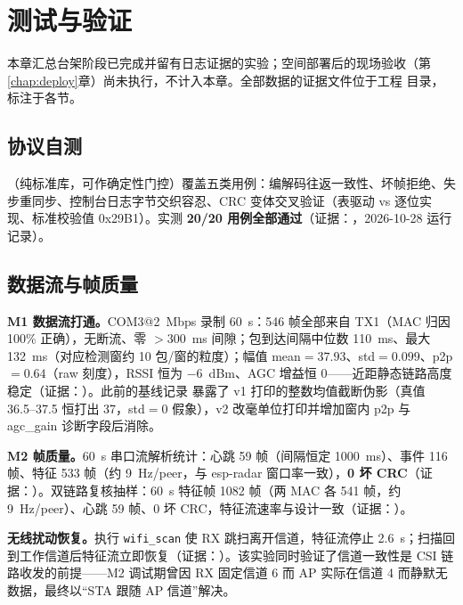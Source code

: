 \chapter{测试与验证}\label{chap:verify}

本章汇总台架阶段已完成并留有日志证据的实验；空间部署后的现场验收（第\ref{chap:deploy}章）尚未执行，不计入本章。全部数据的证据文件位于工程  目录，标注于各节。

\section{协议自测}\label{sec:selftest}

（纯标准库，可作确定性门控）覆盖五类用例：编解码往返一致性、坏帧拒绝、失步重同步、控制台日志字节交织容忍、CRC 变体交叉验证（表驱动 vs 逐位实现、标准校验值 0x29B1）。实测 \textbf{20/20 用例全部通过}（证据：，2026-10-28 运行记录）。

\section{数据流与帧质量}\label{sec:link}

\textbf{M1 数据流打通。}COM3@2~Mbps 录制 60~s：546 帧全部来自 TX1（MAC 归因 100\% 正确），无断流、零 $>$300~ms 间隙；包到达间隔中位数 110~ms、最大 132~ms（对应检测窗约 10 包/窗的粒度）；幅值 mean${}=37.93$、std${}=0.099$、p2p${}=0.64$（raw 刻度），RSSI 恒为 $-6$~dBm、AGC 增益恒 0——近距静态链路高度稳定（证据：）。此前的基线记录  暴露了 v1 打印的整数均值截断伪影（真值 36.5--37.5 恒打出 37，std${}=0$ 假象），v2 改毫单位打印并增加窗内 p2p 与 agc\_gain 诊断字段后消除。

\textbf{M2 帧质量。}60~s 串口流解析统计：心跳 59 帧（间隔恒定 1000~ms）、事件 116 帧、特征 533 帧（约 9~Hz/peer，与 esp-radar 窗口率一致），\textbf{0 坏 CRC}（证据：）。双链路复核抽样：60~s 特征帧 1082 帧（两 MAC 各 541 帧，约 9~Hz/peer）、心跳 59 帧、0 坏 CRC，特征流速率与设计一致（证据：）。

\textbf{无线扰动恢复。}执行 \texttt{wifi\_scan} 使 RX 跳扫离开信道，特征流停止 2.6~s；扫描回到工作信道后特征流立即恢复（证据：）。该实验同时验证了信道一致性是 CSI 链路收发的前提——M2 调试期曾因 RX 固定信道 6 而 AP 实际在信道 4 而静默无数据，最终以“STA 跟随 AP 信道”解决。

